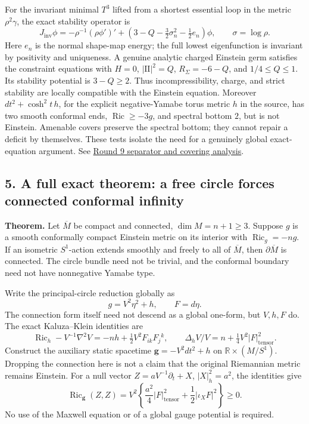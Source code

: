 \documentclass[
  english,
]{article}
\begin{document}
For the invariant minimal \(T^3\) lifted from a shortest essential loop
in the metric \(\rho^2\gamma\), the exact stability operator is \[
 J_{\mathrm{inv}}\phi=-\rho^{-1}(\rho\phi')'
 +(3-Q-\tfrac32\sigma_n^2-\tfrac12e_n)\phi,\qquad \sigma=\log\rho.
\] Here \(e_n\) is the normal shape-map energy; the full lowest
eigenfunction is invariant by positivity and uniqueness. A genuine
analytic charged Einstein germ satisfies the constraint equations with
\(H=0\), \(|\mathrm{II}|^2=Q\), \(R_\Sigma=-6-Q\), and \(1/4\le Q\le1\).
Its stability potential is \(3-Q\ge2\). Thus incompressibility, charge,
and strict stability are locally compatible with the Einstein equation.
Moreover \(dt^2+\cosh^2t\,h\), for the explicit negative-Yamabe torus
metric \(h\) in the source, has two smooth conformal ends,
\(\operatorname{Ric}\ge-3g\), and spectral bottom \(2\), but is not
Einstein. Amenable covers preserve the spectral bottom; they cannot
repair a deficit by themselves. These tests isolate the need for a
genuinely global exact-equation argument. See
\href{../proofs/round9_global.md}{Round 9 separator and covering
analysis}.

\hypertarget{a-full-exact-theorem-a-free-circle-forces-connected-conformal-infinity}{%
\subsection{5. A full exact theorem: a free circle forces connected
conformal
infinity}\label{a-full-exact-theorem-a-free-circle-forces-connected-conformal-infinity}}

\textbf{Theorem.} Let \(\overline M\) be compact and connected,
\(\dim M=n+1\ge3\). Suppose \(g\) is a smooth conformally compact
Einstein metric on its interior with \(\operatorname{Ric}_g=-ng\). If an
isometric \(S^1\)-action extends smoothly and freely to all of
\(\overline M\), then \(\partial\overline M\) is connected. The circle
bundle need not be trivial, and the conformal boundary need not have
nonnegative Yamabe type.

Write the principal-circle reduction globally as \[
 g=V^2\eta^2+h,\qquad F=d\eta.
\] The connection form itself need not descend as a global one-form, but
\(V,h,F\) do. The exact Kaluza--Klein identities are \[
 \operatorname{Ric}_h-V^{-1}\nabla^2V=-nh+\tfrac12V^2F_{ik}F_j{}^k,
 \qquad \Delta_hV/V=n+\tfrac14V^2|F|_{\mathrm{tensor}}^2.
\] Construct the auxiliary static spacetime \(\mathbf g=-V^2dt^2+h\) on
\(\mathbb R\times(M/S^1)\). Dropping the connection here is not a claim
that the original Riemannian metric remains Einstein. For a null vector
\(Z=aV^{-1}\partial_t+X\), \(|X|_h^2=a^2\), the identities give \[
 \operatorname{Ric}_{\mathbf g}(Z,Z)
 =V^2\left\{\frac{a^2}{4}|F|_{\mathrm{tensor}}^2
                 +\frac12|\iota_XF|^2\right\}\ge0.
\] No use of the Maxwell equation or of a global gauge potential is
required.
\end{document}
